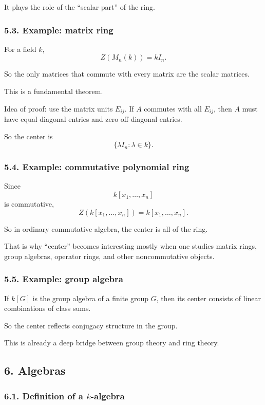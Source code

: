 \documentclass[12pt,a4paper]{article}
\theoremstyle{plain}
\theoremstyle{definition}      %
\begin{document}
	It plays the role of the ``scalar part'' of the ring.
	
	\subsubsection*{5.3. Example: matrix ring}
	
	For a field \(k\),
	\[
	Z(M_n(k))=kI_n.
	\]
	
	So the only matrices that commute with every matrix are the scalar matrices.
	
	This is a fundamental theorem.
	
	Idea of proof: use the matrix units \(E_{ij}\). If \(A\) commutes with all \(E_{ij}\), then \(A\) must have equal diagonal entries and zero off-diagonal entries.
	
	So the center is
	\[
	\{\lambda I_n:\lambda\in k\}.
	\]
	
	\subsubsection*{5.4. Example: commutative polynomial ring}
	
	Since
	\[
	k[x_1,\dots,x_n]
	\]
	is commutative,
	\[
	Z(k[x_1,\dots,x_n])=k[x_1,\dots,x_n].
	\]
	
	So in ordinary commutative algebra, the center is all of the ring.
	
	That is why ``center'' becomes interesting mostly when one studies matrix rings, group algebras, operator rings, and other noncommutative objects.
	
	\subsubsection*{5.5. Example: group algebra}
	
	If \(k[G]\) is the group algebra of a finite group \(G\), then its center consists of linear combinations of class sums.
	
	So the center reflects conjugacy structure in the group.
	
	This is already a deep bridge between group theory and ring theory.
	
	\subsection*{6. Algebras}
	
	\subsubsection*{6.1. Definition of a \(k\)-algebra}
	
\end{document}
